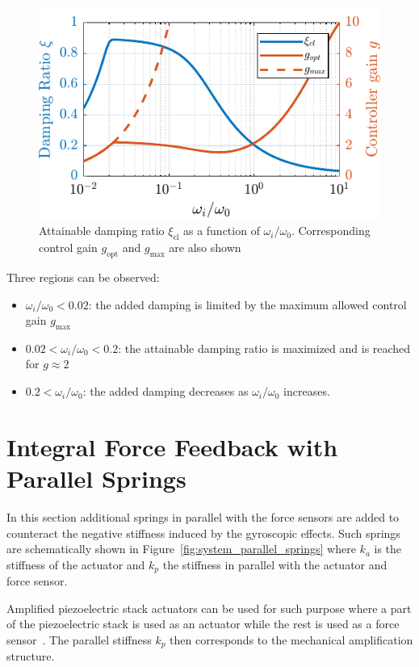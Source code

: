 \documentclass[10pt]{iopart}
\begin{document}
\begin{figure}[htbp]
\centering
\includegraphics[scale=1,scale=0.95]{figs/fig11.pdf}
\caption{\label{fig:mod_iff_damping_wi}Attainable damping ratio \(\xi_\text{cl}\) as a function of \(\omega_i/\omega_0\). Corresponding control gain \(g_\text{opt}\) and \(g_\text{max}\) are also shown}
\end{figure}

Three regions can be observed:
\begin{itemize}
\item \(\omega_i/\omega_0 < 0.02\): the added damping is limited by the maximum allowed control gain \(g_{\text{max}}\)
\item \(0.02 < \omega_i/\omega_0 < 0.2\): the attainable damping ratio is maximized and is reached for \(g \approx 2\)
\item \(0.2 < \omega_i/\omega_0\): the added damping decreases as \(\omega_i/\omega_0\) increases.
\end{itemize}

\section{Integral Force Feedback with Parallel Springs}
\label{sec:org19946d1}
\label{sec:iff_kp}
In this section additional springs in parallel with the force sensors are added to counteract the negative stiffness induced by the gyroscopic effects.
Such springs are schematically shown in Figure~\ref{fig:system_parallel_springs} where \(k_a\) is the stiffness of the actuator and \(k_p\) the stiffness in parallel with the actuator and force sensor.

Amplified piezoelectric stack actuators can be used for such purpose where a part of the piezoelectric stack is used as an actuator while the rest is used as a force sensor~\cite{souleille18_concep_activ_mount_space_applic}.
The parallel stiffness \(k_p\) then corresponds to the mechanical amplification structure.
\end{document}
